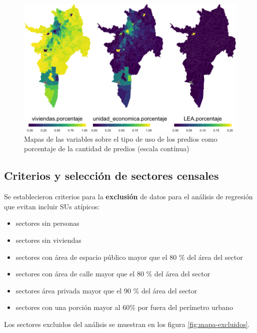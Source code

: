 \documentclass[12pt,a4paper,openany]{book}
\providecommand{\tightlist}{%
  \setlength{\itemsep}{0pt}\setlength{\parskip}{0pt}}
\theoremstyle{definition}
\theoremstyle{definition}
\theoremstyle{definition}
\theoremstyle{remark}
\begin{document}
\begin{figure}

{\centering \includegraphics[width=1\linewidth]{tesis-unigis_files/figure-latex/mapas-usopredios-cont-1} 

}

\caption{Mapas de las variables sobre el tipo de uso de los predios como porcentaje de la cantidad de predios (escala contínua)}\label{fig:mapas-usopredios-cont}
\end{figure}

\subsection{Criterios y selección de sectores
censales}\label{criterios-y-seleccion-de-sectores-censales}

Se establecieron criterios para la \textbf{exclusión} de datos para el
análisis de regresión que evitan incluir SUs atípicos:

\begin{itemize}
\tightlist
\item
  sectores sin personas
\item
  sectores sin viviendas
\item
  sectores con área de espacio público mayor que el 80 \% del área del
  sector
\item
  sectores con área de calle mayor que el 80 \% del área del sector
\item
  sectores área privada mayor que el 90 \% del área del sector
\item
  sectores con una porción mayor al 60\% por fuera del perímetro urbano
\end{itemize}

Los sectores excluidos del análisis se muestran en los figura
\ref{fig:mapa-excluidos}.
\end{document}

